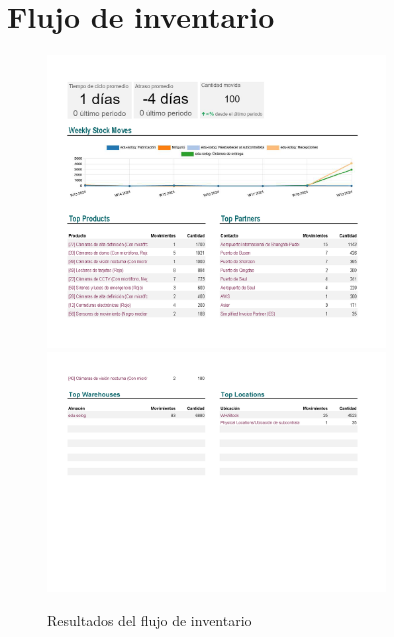 \documentclass{report}
\begin{document}
        \section*{Flujo de inventario}
            \begin{figure}[H]
                \centering
                \includegraphics[width=0.8\textwidth]{./img/FlujoInventario1.png}
                \includegraphics[width=0.8\textwidth]{./img/FlujoInventario2.png}
                \caption{Resultados del flujo de inventario}
            \end{figure}
\end{document}

